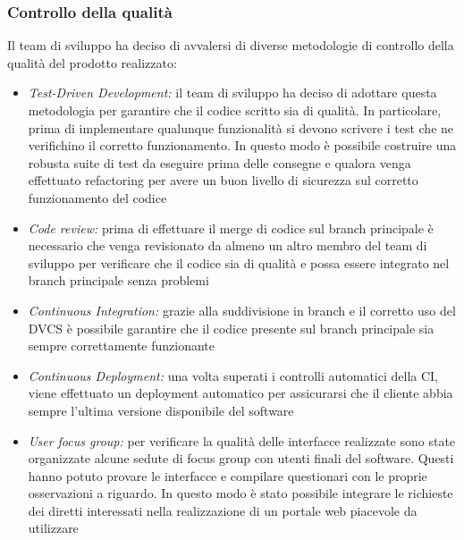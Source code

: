\subsubsection{Controllo della qualità}
Il team di sviluppo ha deciso di avvalersi di diverse metodologie di controllo della qualità del prodotto realizzato:
\begin{itemize}
  \item \emph{Test-Driven Development:} il team di sviluppo ha deciso di adottare questa metodologia per garantire che il codice scritto sia di qualità. In particolare, prima di implementare qualunque funzionalità si devono scrivere i test che ne verifichino il corretto funzionamento. In questo modo è possibile costruire una robusta suite di test da eseguire prima delle consegne e qualora venga effettuato refactoring per avere un buon livello di sicurezza sul corretto funzionamento del codice
  \item \emph{Code review:} prima di effettuare il merge di codice sul branch principale è necessario che venga revisionato da almeno un altro membro del team di sviluppo per verificare che il codice sia di qualità e possa essere integrato nel branch principale senza problemi
  \item \emph{Continuous Integration:} grazie alla suddivisione in branch e il corretto uso del DVCS è possibile garantire che il codice presente sul branch principale sia sempre correttamente funzionante
  \item \emph{Continuous Deployment:} una volta superati i controlli automatici della CI, viene effettuato un deployment automatico per assicurarsi che il cliente abbia sempre l'ultima versione disponibile del software
  \item \emph{User focus group:} per verificare la qualità delle interfacce realizzate sono state organizzate alcune sedute di focus group con utenti finali del software. Questi hanno potuto provare le interfacce e compilare questionari con le proprie osservazioni a riguardo. In questo modo è stato possibile integrare le richieste dei diretti interessati nella realizzazione di un portale web piacevole da utilizzare
\end{itemize}

